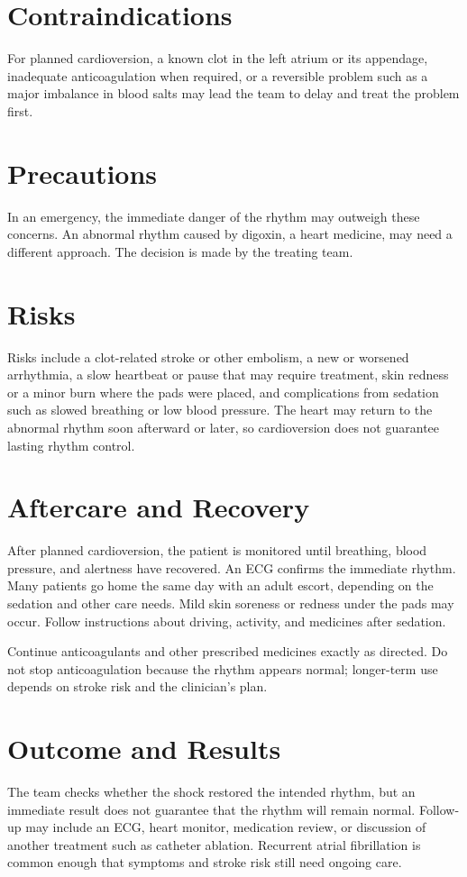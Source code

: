 \section*{Contraindications}
For planned cardioversion, a known clot in the left atrium or its appendage, inadequate anticoagulation when required, or a reversible problem such as a major imbalance in blood salts may lead the team to delay and treat the problem first.

\section*{Precautions}
In an emergency, the immediate danger of the rhythm may outweigh these concerns. An abnormal rhythm caused by digoxin, a heart medicine, may need a different approach. The decision is made by the treating team.

\section*{Risks}
Risks include a clot-related stroke or other embolism, a new or worsened arrhythmia, a slow heartbeat or pause that may require treatment, skin redness or a minor burn where the pads were placed, and complications from sedation such as slowed breathing or low blood pressure. The heart may return to the abnormal rhythm soon afterward or later, so cardioversion does not guarantee lasting rhythm control.

\section*{Aftercare and Recovery}
After planned cardioversion, the patient is monitored until breathing, blood pressure, and alertness have recovered. An ECG confirms the immediate rhythm. Many patients go home the same day with an adult escort, depending on the sedation and other care needs. Mild skin soreness or redness under the pads may occur. Follow instructions about driving, activity, and medicines after sedation.

Continue anticoagulants and other prescribed medicines exactly as directed. Do not stop anticoagulation because the rhythm appears normal; longer-term use depends on stroke risk and the clinician's plan.

\section*{Outcome and Results}
The team checks whether the shock restored the intended rhythm, but an immediate result does not guarantee that the rhythm will remain normal. Follow-up may include an ECG, heart monitor, medication review, or discussion of another treatment such as catheter ablation. Recurrent atrial fibrillation is common enough that symptoms and stroke risk still need ongoing care.

